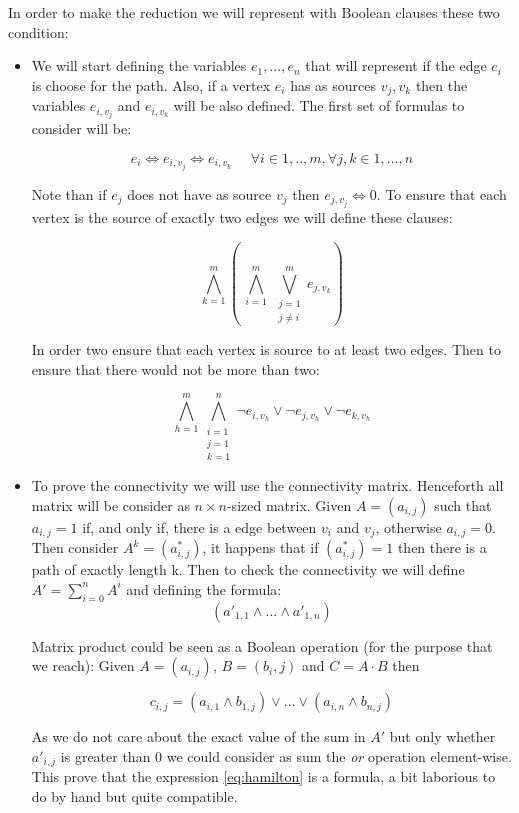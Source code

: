In order to make the reduction we will represent with Boolean clauses these two condition:

\begin{itemize}
\item We will start defining the variables $e_1,...,e_n$ that will represent if the edge $e_i$ is choose for the path. Also, if a vertex $e_i$ has as sources $v_j,v_k$ then the variables $e_{i,v_j}$ and $e_{i,v_k}$ will be also defined. The first set of formulas to consider will be:

  $$
	e_i \iff e_{i,v_j} \iff e_{i,v_k} \ \ \ \ \ \   \forall i \in 1,..,m, \forall j,k \in 1,...,n 
  $$

  Note than if $e_j$ does not have as source $v_j$ then $e_{j,v_j} \iff 0$. To ensure that each vertex is the source of exactly two edges we will define these clauses:

  $$
	\bigwedge_{k=1}^m \left (\ \bigwedge_{i=1}^m \  \bigvee_{\substack{j=1\\  j\ne i}}^m e_{j,v_k} \right )
  $$

  In order two ensure that each vertex is source to at least two edges. Then to ensure that there would not be more than two:

  $$
	\bigwedge_{h=1}^m \bigwedge_{\substack{i=1\\j=1\\k=1}}^n \neg e_{i,v_h} \vee \neg e_{j,v_h} \vee \neg e_{k,v_h} 
  $$

\item To prove the connectivity we will use the connectivity matrix. Henceforth all matrix will be consider as $n\times n$-sized matrix. Given $A = (a_{i,j})$ such that $a_{i,j} = 1$ if, and only if, there is a edge between $v_i$ and $v_j$, otherwise $a_{i,j} = 0 $. Then consider $A^{k} = (a^*_{i,j})$, it happens that if $(a^*_{i,j})=1$ then there is a path of exactly length k. Then to check the connectivity we will define $A' = \sum_{i=0}^n A^i$ and defining the formula:\\
\begin{equation} \label{eq:hamilton}
  (a'_{1,1}\wedge ... \wedge a'_{1,n})  
\end{equation}

  Matrix product could be seen as a Boolean operation (for the purpose that we reach): Given $A = (a_{i,j})$, $B = (b_i,j)$ and $C=A\cdot B$ then 

  $$
	c_{i,j} = (a_{i,1}\wedge b_{1,j}) \vee ... \vee (a_{i,n}\wedge b_{n,j})
  $$

  As we do not care about the exact value of the sum in $A'$ but only whether $a'_{i,j}$ is greater than 0 we could consider as sum the \emph{or} operation element-wise. This prove that the expression \ref{eq:hamilton} is a formula, a bit laborious to do by hand but quite compatible.  

\end{itemize}
